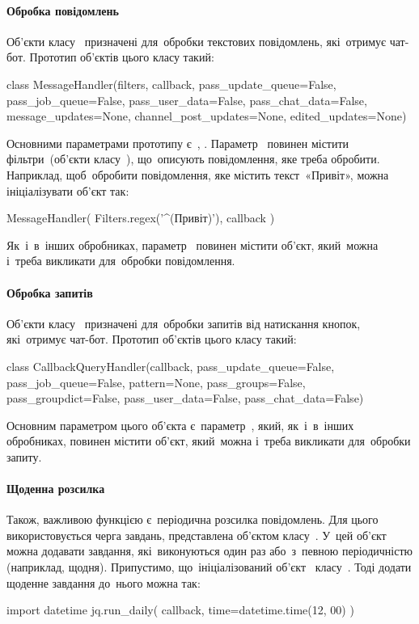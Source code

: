 \documentclass[
	a4paper,
	oneside,
	BCOR = 10mm,
	DIV = 12,
	12pt,
	headings = normal,
]{scrartcl}
\begin{document}
				\paragraph{Обробка повідомлень}
				Об'єкти класу~ призначені для~обробки текстових повідомлень, які~отримує чат-бот. Прототип об'єктів цього класу такий:~\cite{ptb-docs-messagehandler}
				\begin{pythoncode}
class MessageHandler(filters, callback, pass_update_queue=False, pass_job_queue=False, pass_user_data=False, pass_chat_data=False, message_updates=None, channel_post_updates=None, edited_updates=None)
				\end{pythoncode}
				Основними параметрами прототипу є~, . Параметр~ повинен містити фільтри~(об'єкти класу~), що~описують повідомлення, яке треба обробити. Наприклад, щоб~обробити повідомлення, яке містить текст~«Привіт», можна ініціалізувати об'єкт так:
				\begin{pythoncode}
					MessageHandler(
					    Filters.regex('^(Привіт)'),
					    callback
					)
				\end{pythoncode}
				Як~і~в~інших обробниках, параметр~ повинен містити об'єкт, який~можна і~треба викликати для~обробки повідомлення.

				\paragraph{Обробка запитів}
				Об'єкти класу~ призначені для~обробки запитів від натискання кнопок, які~отримує чат-бот. Прототип об'єктів цього класу такий:~\cite{ptb-docs-callbackqueryhandler}
				\begin{pythoncode}
class CallbackQueryHandler(callback, pass_update_queue=False, pass_job_queue=False, pattern=None, pass_groups=False, pass_groupdict=False, pass_user_data=False, pass_chat_data=False)
				\end{pythoncode}
				Основним параметром цього об'єкта є~параметр~, який, як~і~в~інших обробниках, повинен містити об'єкт, який~можна і~треба викликати для~обробки запиту.
				
				\paragraph{Щоденна розсилка}
				Також, важливою функцією є~періодична розсилка повідомлень. Для цього використовується черга завдань, представлена об'єктом класу~. У~цей об'єкт можна додавати завдання, які~виконуються один раз або~з~певною періодичністю (наприклад, щодня). Припустимо, що~ініціалізований об'єкт~ класу~. Тоді додати щоденне завдання до~нього можна так:~\cite{ptb-docs-jobqueue}
				\begin{pythoncode}
					import datetime
					jq.run_daily(
					    callback,
					    time=datetime.time(12, 00)
					)
				\end{pythoncode}
\end{document}
